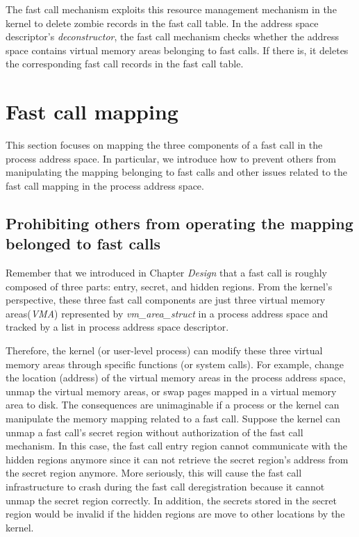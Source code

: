 The fast call mechanism exploits this resource management mechanism 
in the kernel to delete zombie records in the fast call table. 
In the address space descriptor's \emph{deconstructor}, the fast call mechanism 
checks whether the address space contains virtual memory areas belonging 
to fast calls. If there is, it deletes the corresponding fast 
call records in the fast call table.


\section{Fast call mapping}
This section focuses on mapping the three components of a fast call in the process address space. 
In particular, we introduce how to prevent others from manipulating the mapping belonging to fast 
calls and other issues related to the fast call mapping in the process address space.

\subsection{Prohibiting others from operating the mapping belonged to fast calls}
Remember that we introduced in Chapter \emph{Design} 
that a fast call is roughly composed of three parts: 
entry, secret, and hidden regions. From the kernel's perspective, 
these three fast call components are just three virtual memory 
areas(\emph{VMA})\cite{10.5555/983550} represented by \emph{vm\_area\_struct} in a process address space and 
tracked by a list in process address space descriptor\cite{10.5555/983550}.

Therefore, the kernel (or user-level process) can modify these three virtual memory areas 
through specific functions (or system calls). 
For example, change the location (address) of the virtual memory areas in the process address space, 
unmap the virtual memory areas, or swap pages mapped in a virtual memory area to disk. The consequences
 are unimaginable if a process or the kernel can manipulate the memory mapping related to a fast call. 
 Suppose the kernel can unmap a fast 
call's secret region without authorization of the fast call mechanism. 
In this case, the fast call entry region cannot communicate with the hidden regions anymore 
since it can not retrieve the secret region's address from the secret region anymore. 
More seriously, this will cause the fast call infrastructure to crash during the fast call 
deregistration because it cannot unmap the secret region correctly. In addition, the secrets 
stored in the secret region would be invalid if the hidden regions are move to other locations by the kernel.


